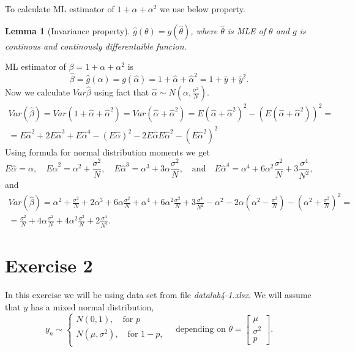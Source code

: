 \documentclass[12pt, a4paper]{article}\usepackage[]{graphicx}\usepackage[]{color}
\newtheorem{lemma}{Lemma}
\begin{document}
To calculate ML estimator of $1+\alpha+\alpha^{2}$ we use below property.
%
\begin{lemma}[Invariance property]
$\hat{g}(\theta)=g(\hat{\theta})$, where $\hat{\theta}$ is MLE of $\theta$ and $g$ is continous and continously differentaible funcion.
\end{lemma}
%
ML estimator of $\beta=1+\alpha+\alpha^{2}$ is 
\[\hat{\beta}=\hat{g}(\alpha)=g(\hat{\alpha})=1+\hat{\alpha}+\hat{\alpha}^{2}=1+\bar{y}+\bar{y}^{2}.\]
%
Now we calculate $Var\hat{\beta}$ using fact that $\hat{\alpha}\sim N(\alpha,\frac{\sigma^{2}}{N})$.
%
\begin{gather*}
Var(\hat{\beta})=Var(1+\hat{\alpha}+\hat{\alpha}^{2})=Var(\hat{\alpha}+\hat{\alpha}^{2})=E(\hat{\alpha}+\hat{\alpha}^{2})^{2}-(E(\hat{\alpha}+\hat{\alpha}^{2}))^{2}=\\
=E\hat{\alpha}^{2}+2E\hat{\alpha}^{3}+E\hat{\alpha}^{4}-(E\hat{\alpha})^{2}-2E\hat{\alpha}E\hat{\alpha}^{2}-(E\hat{\alpha}^{2})^{2}
\end{gather*}
Using formula for normal distribution moments we get
\[ E\hat{\alpha}=\alpha ,\quad E\hat{\alpha}^{2}=\alpha^{2}+\frac{\sigma^{2}}{N} ,\quad E\hat{\alpha}^{3}=\alpha^{3}+3\alpha\frac{\sigma^{2}}{N} ,\quad\text{and}\quad
E\hat{\alpha}^{4}=\alpha^{4}+6\alpha^{2}\frac{\sigma^{2}}{N}+3\frac{\sigma^{4}}{N^{2}},
\]
and
\begin{gather*}
Var(\hat{\beta})=\alpha^{2}+\frac{\sigma^{2}}{N}+2\alpha^{3}+6\alpha\frac{\sigma^{2}}{N}+\alpha^{4}+6\alpha^{2}\frac{\sigma^{2}}{N}+3\frac{\sigma^{4}}{N^{2}}
-\alpha^{2}-2\alpha\left(\alpha^{2}-\frac{\sigma^{2}}{N}\right) -\left(\alpha^{2}+\frac{\sigma^{2}}{N}\right)^{2}= \\
= \frac{\sigma^{2}}{N}+4\alpha\frac{\sigma^{2}}{N}+4\alpha^{2}\frac{\sigma^{2}}{N}+2\frac{\sigma^4}{N^{2}}.
\end{gather*}



\section{Exercise 2}
In this exercise we will be using data set from file \textit{datalab4-1.xlsx}. We will assume that $y$ has a mixed normal distribution,
\[ y_n \sim 
  \begin{cases}
    N(0,1), \quad\text{for } p \\
    N(\mu, \sigma^2), \quad\text{for } 1-p, \\
  \end{cases}
  \quad\text{depending on }
  \theta = \begin{bmatrix} \mu \\ \sigma^2 \\ p \end{bmatrix}.
\]
\end{document}
